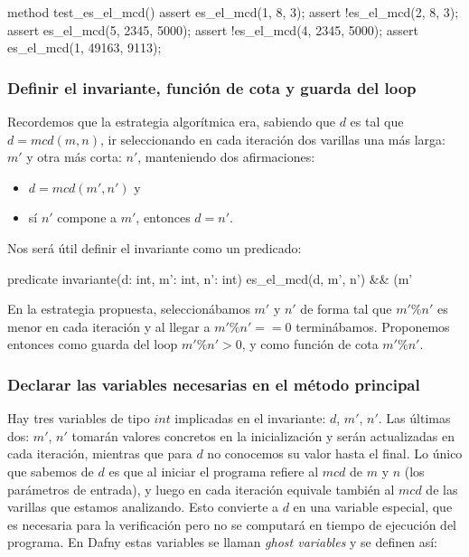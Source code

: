 \documentclass[12pt, a4paper, openany, fleqn]{book}
\begin{document}
    \begin{greenbox}
    \begin{dafny}[gobble=8]
        method test_es_el_mcd(){
            assert es_el_mcd(1, 8, 3);
            assert !es_el_mcd(2, 8, 3);
            assert es_el_mcd(5, 2345, 5000);
            assert !es_el_mcd(4, 2345, 5000);
            assert es_el_mcd(1, 49163, 9113);
        }
    \end{dafny}
    \end{greenbox}

    \subsubsection{Definir el invariante, función de cota y guarda del loop}

    Recordemos que la estrategia algorítmica era, sabiendo que $d$ es tal que $d = mcd(m, n)$, ir seleccionando en cada iteración dos varillas una más larga: $m'$ y otra más corta: $n'$, manteniendo dos afirmaciones:
    \begin{itemize}
        \item $d = mcd(m', n')$ y
        \item sí $n'$ compone a $m'$, entonces $d = n'$.
    \end{itemize}

    Nos será útil definir el invariante como un predicado:

    \begin{greenbox}
    \begin{dafny}[gobble=8]
        predicate invariante(d: int, m': int, n': int) {
            es_el_mcd(d, m', n')
            && (m' %
        }
    \end{dafny}
    \end{greenbox}

    En la estrategia propuesta, seleccionábamos $m'$ y $n'$ de forma tal que $m'\%n'$ es menor en cada iteración y al llegar a $m'\%n' == 0$ terminábamos. Proponemos entonces como guarda del loop $m'\%n'>0$, y como función de cota $m'\%n'$.

    \subsubsection{Declarar las variables necesarias en el método principal}
    Hay tres variables de tipo $int$ implicadas en el invariante: $d$, $m'$, $n'$.
    Las últimas dos: $m'$, $n'$ tomarán valores concretos en la inicialización y serán actualizadas en cada iteración, mientras que para $d$ no conocemos su valor hasta el final. Lo único que sabemos de $d$ es que al iniciar el programa refiere al $mcd$ de $m$ y $n$ (los parámetros de entrada), y luego en cada iteración equivale también al $mcd$ de las varillas que estamos analizando. Esto convierte a $d$ en una variable especial, que es necesaria para la verificación pero no se computará en tiempo de ejecución del programa. En Dafny estas variables se llaman \textit{ghost variables} y se definen así:
\end{document}
